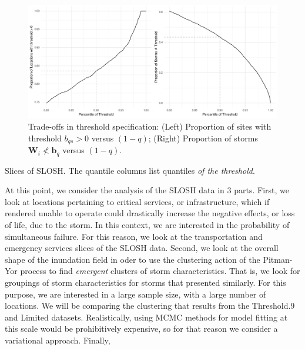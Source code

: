 \begin{figure}[ht]
    \centering
    \caption{Trade-offs in threshold specification:
    (Left) Proportion of sites with threshold $b_{qs} > 0$ versus $(1 - q)$; 
    (Right) Proportion of storms $\bm{W}_i \not< \bm{b}_q$ versus $(1 - q)$.
    \label{fig:thresholdselection}}
    \includegraphics[width=0.9\linewidth]{plots/explore_threshold}
\end{figure}

\begin{table}[htb]
    \centering
    \caption{Slices of SLOSH.  The quantile columns list quantiles \emph{of the threshold}. \label{tab:datasets}}
    
\end{table}

At this point, we consider the analysis of the SLOSH data in 3 parts.  First, we
    look at locations pertaining to critical services, or infrastructure, which if 
    rendered unable to operate could drastically increase the negative effects, or 
    loss of life, due to the storm.
    In this context, we are interested in the probability of simultaneous failure.
    For this reason, we look at the transportation and emergency services slices
    of the SLOSH data.
    Second, we look at the overall shape of the inundation field in oder to use
    the clustering action of the Pitman-Yor process to find \emph{emergent} clusters
    of storm characteristics.  That is, we look for groupings of storm characteristics 
    for storms that presented similarly.  For this purpose, we are interested in a large
    sample size, with a large number of locations.  We will be comparing the clustering
    that results from the Threshold.9 and Limited datasets. 
    Realistically, using MCMC methods for model fitting at this scale would be prohibitively 
    expensive, so for that reason we consider a variational approach.
    Finally, 

